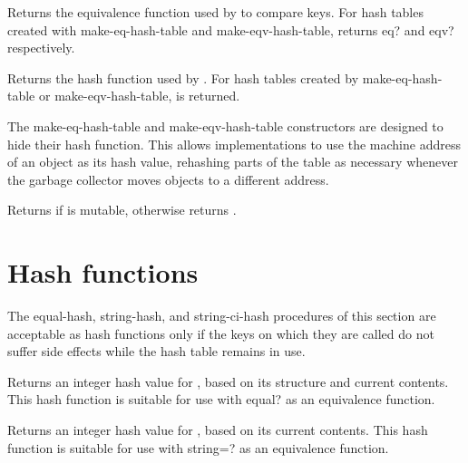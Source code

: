 \begin{entry}{}

Returns the equivalence function used by
 to compare keys.  For hash tables
created with {\cf make-eq-hash-table} and {\cf make-eqv-hash-table},
returns {\cf eq?} and {\cf eqv?} respectively.
\end{entry}

\begin{entry}{}

Returns the hash function used by .
For hash tables created by {\cf make-eq-hash-table} 
or {\cf make-eqv-hash-table}, \schfalse{} is returned.

\begin{rationale}
The {\cf make-eq-hash-table} and {\cf make-eqv-hash-table} constructors
are designed to hide their hash function.  This allows implementations
to use the machine address of an object as its hash value, rehashing
parts of the table as necessary whenever the garbage collector moves
objects to a different address.
\end{rationale}
\end{entry}

\begin{entry}{}

Returns \schtrue{} if  is mutable, otherwise returns \schfalse{}.
\end{entry}

\section{Hash functions}

The {\cf equal-hash}, {\cf string-hash}, and {\cf string-ci-hash}
procedures of this section are acceptable as hash functions only
if the keys on which they are called do not suffer side effects
while the hash table remains in use.

\begin{entry}{}

Returns an integer hash value for , based on
its structure and current contents.  This hash function is suitable
for use with {\cf equal?} as an equivalence function.
\end{entry}

\begin{entry}{}

Returns an integer hash value for , based on
its current contents.
This hash function is suitable
for use with {\cf string=?} as an equivalence function.
\end{entry}

